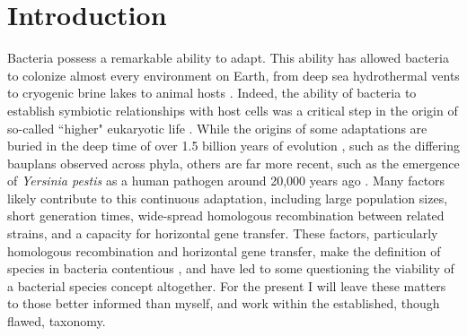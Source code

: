 \chapter{Introduction}
\ifpdf
    \graphicspath{{Introduction/IntroductionFigs/PNG/}{Introduction/IntroductionFigs/PDF/}{Introduction/IntroductionFigs/}}
\else
    \graphicspath{{Introduction/IntroductionFigs/EPS/}{Introduction/IntroductionFigs/}}
\fi

Bacteria possess a remarkable ability to adapt. This ability has allowed bacteria to colonize almost every environment on Earth, from deep sea hydrothermal vents \parencite{Jorgensen1992} to cryogenic brine lakes \parencite{Murray2012} to animal hosts \parencite{Finlay1997}. Indeed, the ability of bacteria to establish symbiotic relationships with host cells was a critical step in the origin of so-called ``higher" eukaryotic life \parencite{Sagan1967}. While the origins of some adaptations are buried in the deep time of over 1.5 billion years of evolution \parencite{Doolittle1996}, such as the differing bauplans observed across phyla, others are far more recent, such as the emergence of \textit{Yersinia pestis} as a human pathogen around 20,000 years ago \parencite{Achtman1999}. Many factors likely contribute to this continuous adaptation, including large population sizes, short generation times, wide-spread homologous recombination between related strains, and a capacity for horizontal gene transfer. These factors, particularly homologous recombination and horizontal gene transfer, make the definition of species in bacteria contentious \parencite{Achtman2008, Doolittle2009}, and have led to some questioning the viability of a bacterial species concept altogether. For the present I will leave these matters to those better informed than myself, and work within the established, though flawed, taxonomy.

